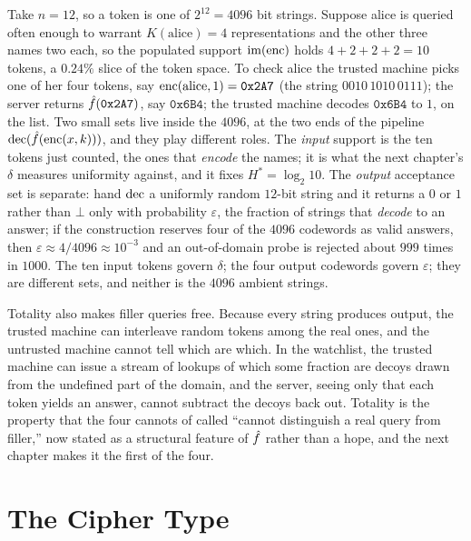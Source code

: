 \begin{example}
\label{ex:watchlist-numbers}
Take $n = 12$, so a token is one of $2^{12} = 4096$ bit strings. Suppose
alice is queried often enough to warrant $K(\mathrm{alice}) = 4$
representations and the other three names two each, so the populated
support $\mathrm{im}(\operatorname{enc})$ holds $4 + 2 + 2 + 2 = 10$ tokens, a $0.24\%$
slice of the token space. To check alice the trusted machine picks one of
her four tokens, say $\operatorname{enc}(\mathrm{alice}, 1) = \mathtt{0x2A7}$ (the string
$0010\,1010\,0111$); the server returns $\hat{f}(\mathtt{0x2A7})$, say
$\mathtt{0x6B4}$; the trusted machine decodes $\mathtt{0x6B4}$ to $1$, on
the list. Two small sets live inside the $4096$, at the two ends of the
pipeline $\operatorname{dec}(\hat{f}(\operatorname{enc}(x,k)))$, and they play different roles. The
\emph{input} support is the ten tokens just counted, the ones that
\emph{encode} the names; it is what the next chapter's $\delta$ measures
uniformity against, and it fixes $H^* = \log_2 10$. The \emph{output}
acceptance set is separate: hand $\operatorname{dec}$ a uniformly random $12$-bit string
and it returns a $0$ or $1$ rather than $\bot$ only with probability
$\varepsilon$, the fraction of strings that \emph{decode} to an answer; if
the construction reserves four of the $4096$ codewords as valid answers,
then $\varepsilon \approx 4/4096 \approx 10^{-3}$ and an out-of-domain probe
is rejected about $999$ times in $1000$. The ten input tokens govern
$\delta$; the four output codewords govern $\varepsilon$; they are different
sets, and neither is the $4096$ ambient strings.
\end{example}

Totality also makes filler queries free. Because every string produces
output, the trusted machine can interleave random tokens among the real
ones, and the untrusted machine cannot tell which are which. In the
watchlist, the trusted machine can issue a stream of lookups of which some
fraction are decoys drawn from the undefined part of the domain, and the
server, seeing only that each token yields an answer, cannot subtract the
decoys back out. Totality is the property that the four cannots of
 called ``cannot distinguish a real query from
filler,'' now stated as a structural feature of $\hat{f}$ rather than a hope,
and the next chapter makes it the first of the four.

\section{The Cipher Type}
\label{sec:cipher-type}

